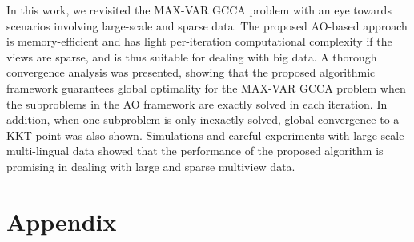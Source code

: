 \documentclass[10pt,journal]{IEEEtran}
\begin{document}
In this work, we revisited the MAX-VAR GCCA problem with an eye towards scenarios involving large-scale and sparse data. 
The proposed AO-based approach is memory-efficient and has light per-iteration computational complexity if the views are sparse, and is thus suitable for dealing with big data.
A thorough convergence analysis was presented, showing that the proposed algorithmic framework
guarantees global optimality for the MAX-VAR GCCA problem when the subproblems in the AO framework are exactly solved in each iteration. In addition, when one subproblem is only inexactly solved, global convergence to a KKT point
was also shown. Simulations and careful experiments with large-scale multi-lingual data showed that the performance of the proposed algorithm is promising in dealing with large and sparse multiview data.



\ifplainver
    \section*{Appendix}
    \renewcommand{\thesubsection}{\Alph{subsection}}
\else
\appendices
\fi
\end{document}
